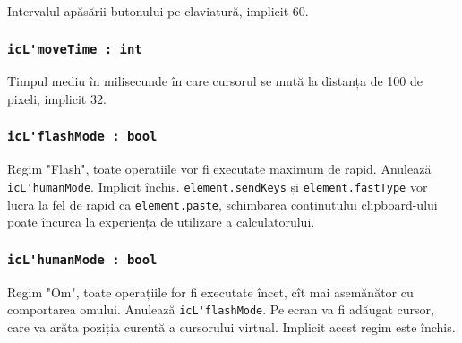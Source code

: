 Intervalul apăsării butonului pe claviatură, implicit 60.

\subsubsection{\lstinline|icL'moveTime : int|}

Timpul mediu în milisecunde în care cursorul se mută la distanța de 100 de pixeli, implicit 32.

\subsubsection{\lstinline|icL'flashMode : bool|}

Regim "Flash", toate operațiile vor fi executate maximum de rapid. Anulează \lstinline|icL'humanMode|. Implicit închis. \lstinline|element.sendKeys| și \lstinline|element.fastType| vor lucra la fel de rapid ca \lstinline|element.paste|, schimbarea conținutului clipboard-ului poate încurca la experiența de utilizare a calculatorului.

\subsubsection{\lstinline|icL'humanMode : bool|}

Regim "Om", toate operațiile for fi executate încet, cît mai asemănător cu comportarea omului. Anulează \lstinline|icL'flashMode|. Pe ecran va fi adăugat cursor, care va arăta poziția curentă a cursorului virtual. Implicit acest regim este închis.

